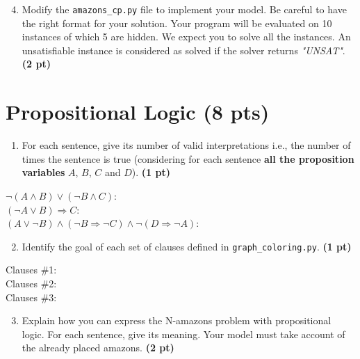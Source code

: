 \documentclass[11pt,a4paper]{report}
\begin{document}
\begin{answers}[10cm]

\end{answers}

\begin{enumerate}
	\setcounter{enumi}{3}
	\item Modify the \texttt{amazons\_cp.py} file to implement your model.
	Be careful to have the right format for your solution. 
	Your program will be evaluated on 10 instances of which 5 are hidden. 
	We expect you to solve all the instances.
	An unsatisfiable instance is considered as solved if the solver returns \textit{"UNSAT"}. \textbf{(2 pt)}
\end{enumerate}

\section{Propositional Logic (8 pts)}

\begin{enumerate}
	\item For each sentence, give its number of valid interpretations i.e., the number of times the sentence is true 
	(considering for each sentence {\bf all the proposition variables} $A$, $B$, $C$ and $D$). \textbf{(1 pt)}
\end{enumerate}

\begin{answers}[4cm]
	$\neg ( A \land B) \lor (\neg B \land C)$: \\
	$(\neg A \lor B) \Rightarrow C $: \\
	$( A \lor \neg B) \land (\neg B \Rightarrow \neg C) \land \neg (D \Rightarrow \neg A)$: 
\end{answers}

\newpage
\begin{enumerate}
	\setcounter{enumi}{1}
	\item Identify the goal of each set of clauses defined in \texttt{graph\_coloring.py}. \textbf{(1 pt)}
\end{enumerate}

\begin{answers}[4cm]
	Clauses \#1: \\
	Clauses \#2: \\
	Clauses \#3: \\
\end{answers}

\begin{enumerate}
	\setcounter{enumi}{2}
	\item Explain how you can express the N-amazons problem with propositional logic. For each sentence, give its meaning.
	Your model must take account of the already placed amazons. \textbf{(2 pt)}
\end{enumerate}
\end{document}
